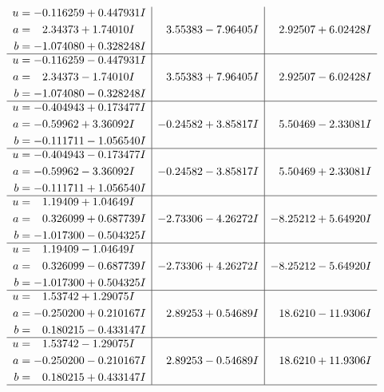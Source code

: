 \documentclass[1p]{elsarticle_modified}
\theoremstyle{definition}
\begin{document}
$$\begin{array}{c|c|c}
\begin{aligned}
u &= -0.116259 + 0.447931 I \\
a &= \phantom{-}2.34373 + 1.74010 I \\
b &= -1.074080 + 0.328248 I\end{aligned}
 & \phantom{-}3.55383 - 7.96405 I & \phantom{-}2.92507 + 6.02428 I \\ \hline\begin{aligned}
u &= -0.116259 - 0.447931 I \\
a &= \phantom{-}2.34373 - 1.74010 I \\
b &= -1.074080 - 0.328248 I\end{aligned}
 & \phantom{-}3.55383 + 7.96405 I & \phantom{-}2.92507 - 6.02428 I \\ \hline\begin{aligned}
u &= -0.404943 + 0.173477 I \\
a &= -0.59962 + 3.36092 I \\
b &= -0.111711 - 1.056540 I\end{aligned}
 & -0.24582 + 3.85817 I & \phantom{-}5.50469 - 2.33081 I \\ \hline\begin{aligned}
u &= -0.404943 - 0.173477 I \\
a &= -0.59962 - 3.36092 I \\
b &= -0.111711 + 1.056540 I\end{aligned}
 & -0.24582 - 3.85817 I & \phantom{-}5.50469 + 2.33081 I \\ \hline\begin{aligned}
u &= \phantom{-}1.19409 + 1.04649 I \\
a &= \phantom{-}0.326099 + 0.687739 I \\
b &= -1.017300 - 0.504325 I\end{aligned}
 & -2.73306 - 4.26272 I & -8.25212 + 5.64920 I \\ \hline\begin{aligned}
u &= \phantom{-}1.19409 - 1.04649 I \\
a &= \phantom{-}0.326099 - 0.687739 I \\
b &= -1.017300 + 0.504325 I\end{aligned}
 & -2.73306 + 4.26272 I & -8.25212 - 5.64920 I \\ \hline\begin{aligned}
u &= \phantom{-}1.53742 + 1.29075 I \\
a &= -0.250200 + 0.210167 I \\
b &= \phantom{-}0.180215 - 0.433147 I\end{aligned}
 & \phantom{-}2.89253 + 0.54689 I & \phantom{-}18.6210 - 11.9306 I \\ \hline\begin{aligned}
u &= \phantom{-}1.53742 - 1.29075 I \\
a &= -0.250200 - 0.210167 I \\
b &= \phantom{-}0.180215 + 0.433147 I\end{aligned}
 & \phantom{-}2.89253 - 0.54689 I & \phantom{-}18.6210 + 11.9306 I\\
 \hline 
 \end{array}$$\newpage\newpage\renewcommand{\arraystretch}{1}
\end{document}

